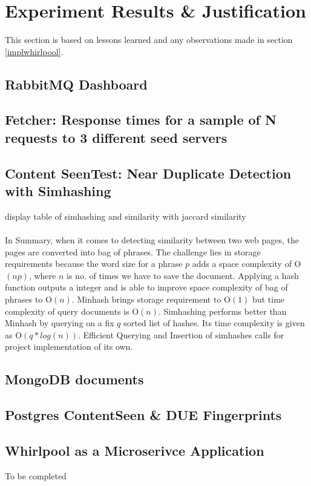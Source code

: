 \chapter{Experiment Results \& Justification}
This section is based on lessons learned and any observations made in section \ref{implwhirlpool}.

\section{RabbitMQ Dashboard}

\pagebreak

\section{Fetcher: Response times for a sample of N requests to 3 different seed servers}

\pagebreak

\section{Content SeenTest: Near Duplicate Detection with Simhashing}\label{handle_dedupe}
display table of simhashing and similarity with jaccard similarity
\\
\\
In Summary, when it comes to detecting similarity between two web pages, the pages are converted into
bag of phrases. The challenge lies in storage requirements because the word size for a phrase $p$ adds
a space complexity of O$(np)$, where $n$ is no. of times we have to save the document. Applying a hash
function outputs a integer and is able to improve space complexity of bag of phrases to O$(n)$.
Minhash\cite{dedupe} brings storage requirement to O$(1)$ but time complexity of query documents is
O$(n)$. Simhashing\cite{dedupe} performs better than Minhash by querying on a fix $q$ sorted list of
hashes. Its time complexity is given as O$(q * log(n))$. Efficient Querying and Insertion of simhashes
calls for project implementation of its own.

\pagebreak

\section{MongoDB documents}

\pagebreak

\section{Postgres ContentSeen \& DUE Fingerprints}

\pagebreak

\section{Whirlpool as a Microserivce Application}
To be completed

\pagebreak